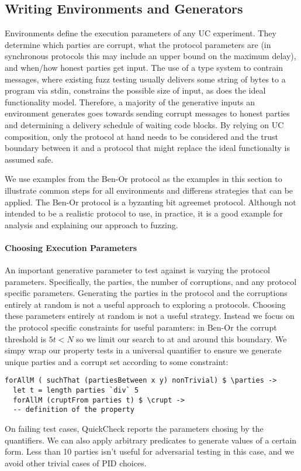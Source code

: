 \subsection{Writing Environments and Generators}
Environments define the execution parameters of any UC experiment.
They determine which parties are corrupt, what the protocol parameters are (in synchronous protocols this may include an upper bound on the maximum delay), and when/how honest parties get input.
The use of a type system to contrain messages, where existing fuzz testing usually delivers some string of bytes to a program via stdin, constrains the possible size of input, as does the ideal functionality model.
Therefore, a majority of the generative inputs an environment generates goes towards sending corrupt messages to honest parties and determining a delivery schedule of waiting code blocks.
By relying on UC composition, only the protocol at hand needs to be considered and the trust boundary between it and a protocol that might replace the ideal functionalty is assumed safe.

We use examples from the Ben-Or protocol as the examples in this section to illustrate common steps for all environments and differens strategies that can be applied.
The Ben-Or protocol is a byzanting bit agreemet protocol. Although not intended to be a realistic protocol to use, in practice, it is a good example for analysis and explaining our approach to fuzzing.

\paragraph{Choosing Execution Parameters}
An important generative parameter to test against is varying the protocol parameters. Specifically, the parties, the number of corruptions, and any protocol specific parameters.
Generating the parties in the protocol and the corruptions entirely at random is not a useful approach to exploring a protocols.
Choosing these parameters entirely at random is not a useful strategy.
Instead we focus on the protocol specific constraints for useful paramters: in Ben-Or the corrupt threshold is $5t < N$ so we limit our search to at and around this boundary.
We simpy wrap our property tests in a universal quantifier to ensure we generate unique parties and a corrupt set according to some constraint:
\begin{lstlisting}
forAllM ( suchThat (partiesBetween x y) nonTrivial) $ \parties -> 
  let t = length parties `div` 5
  forAllM (cruptFrom parties t) $ \crupt ->
  -- definition of the property
\end{lstlisting}
On failing test cases, QuickCheck reports the parameters chosing by the quantifiers.
We can also apply arbitrary predicates to generate values of a certain form.
Less than 10 parties isn't useful for adversarial testing in this case, and we avoid other trivial cases of PID choices.

